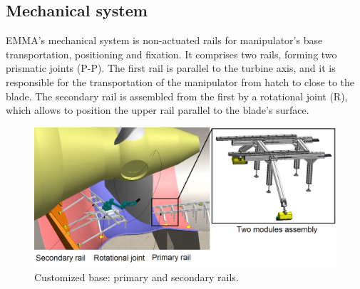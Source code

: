 % 


 

\subsection{Mechanical system}

EMMA's mechanical system is non-actuated rails for manipulator's base
transportation, positioning and fixation. It comprises two rails, forming two
prismatic joints (P-P). The first rail is parallel to the
turbine axis, and it is responsible for the transportation of the manipulator from
hatch to close to the blade. The secondary rail is assembled from the first by
a rotational joint (R), which allows to position the upper rail parallel to the
blade's surface.

\begin{figure}
	\centering
	\includegraphics[width=1.0\columnwidth]{figs/mecanica/EMMA_Base_Secundaria_03.PNG}
    \caption{Customized base: primary and secondary rails.}
    \label{fig:base}
\end{figure}

